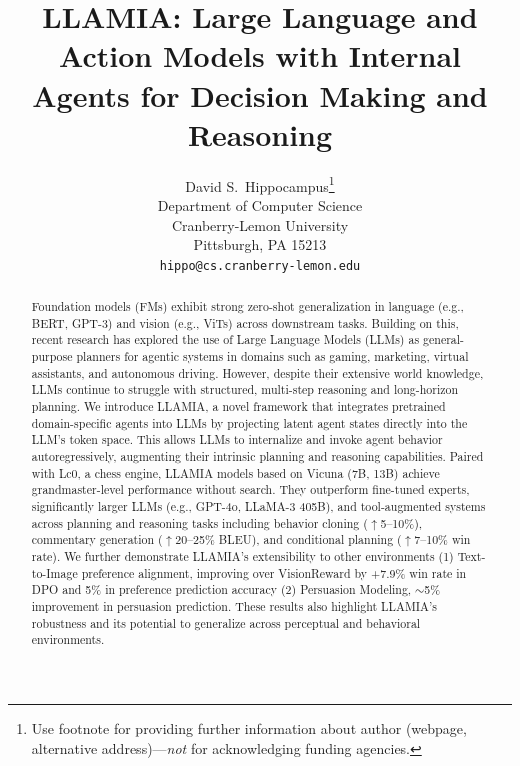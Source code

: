 \documentclass{article}
\title{LLAMIA: Large Language and Action Models with Internal Agents for Decision Making and Reasoning}
\author{%
  David S.~Hippocampus\thanks{Use footnote for providing further information
    about author (webpage, alternative address)---\emph{not} for acknowledging
    funding agencies.} \\
  Department of Computer Science\\
  Cranberry-Lemon University\\
  Pittsburgh, PA 15213 \\
  \texttt{hippo@cs.cranberry-lemon.edu} \\
}
\theoremstyle{plain}
\theoremstyle{definition}
\theoremstyle{remark}
\begin{document}
\maketitle


\begin{abstract}
Foundation models (FMs) exhibit strong zero-shot generalization in language (e.g., BERT, GPT-3) and vision (e.g., ViTs) across downstream tasks. Building on this, recent research has explored the use of Large Language Models (LLMs) as general-purpose planners for agentic systems in domains such as gaming, marketing, virtual assistants, and autonomous driving. However, despite their extensive world knowledge, LLMs continue to struggle with structured, multi-step reasoning and long-horizon planning. We introduce LLAMIA, a novel framework that integrates pretrained domain-specific agents into LLMs by projecting latent agent states directly into the LLM’s token space. This allows LLMs to internalize and invoke agent behavior autoregressively, augmenting their intrinsic planning and reasoning capabilities.
Paired with Lc0, a chess engine, LLAMIA models based on Vicuna (7B, 13B) achieve grandmaster-level performance without search. They outperform fine-tuned experts, significantly larger LLMs (e.g., GPT-4o, LLaMA-3 405B), and tool-augmented systems across planning and reasoning tasks including behavior cloning ($\uparrow$5–10\%), commentary generation ($\uparrow$20–25\% BLEU), and conditional planning ($\uparrow$7–10\% win rate). We further demonstrate LLAMIA's extensibility to other environments (1) Text-to-Image preference alignment, improving over VisionReward by +7.9\% win rate in DPO and 5\% in preference prediction accuracy (2) Persuasion Modeling, $\sim$5\% improvement in persuasion prediction. These results also highlight LLAMIA’s robustness and its potential to generalize across perceptual and behavioral environments.
\vspace{-5mm}
\end{abstract}
\end{document}
